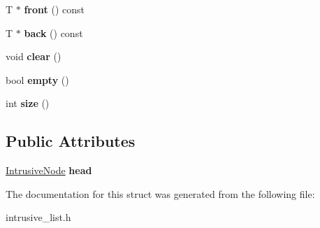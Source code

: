 \begin{DoxyCompactItemize}
\item 
\hypertarget{structIntrusiveList_a8e350ac902999c48924654de8875b2fa}{}T $\ast$ {\bfseries front} () const \label{structIntrusiveList_a8e350ac902999c48924654de8875b2fa}

\item 
\hypertarget{structIntrusiveList_aa2156fd9367a6db106fc7ac081bece7b}{}T $\ast$ {\bfseries back} () const \label{structIntrusiveList_aa2156fd9367a6db106fc7ac081bece7b}

\item 
\hypertarget{structIntrusiveList_a7a2d8a89faa7a5b92c783d1cf373a346}{}void {\bfseries clear} ()\label{structIntrusiveList_a7a2d8a89faa7a5b92c783d1cf373a346}

\item 
\hypertarget{structIntrusiveList_af3f0bf57760bb4ca7c15fd4f2e93f731}{}bool {\bfseries empty} ()\label{structIntrusiveList_af3f0bf57760bb4ca7c15fd4f2e93f731}

\item 
\hypertarget{structIntrusiveList_aaf2c0152fd8d0e24cd302099eddb19ca}{}int {\bfseries size} ()\label{structIntrusiveList_aaf2c0152fd8d0e24cd302099eddb19ca}

\end{DoxyCompactItemize}
\subsection*{Public Attributes}
\begin{DoxyCompactItemize}
\item 
\hypertarget{structIntrusiveList_a6c65e0b9c6c08b0cd94dd470602f8b7b}{}\hyperlink{structIntrusiveNode}{Intrusive\+Node} {\bfseries head}\label{structIntrusiveList_a6c65e0b9c6c08b0cd94dd470602f8b7b}

\end{DoxyCompactItemize}


The documentation for this struct was generated from the following file\+:\begin{DoxyCompactItemize}
\item 
intrusive\+\_\+list.\+h\end{DoxyCompactItemize}
